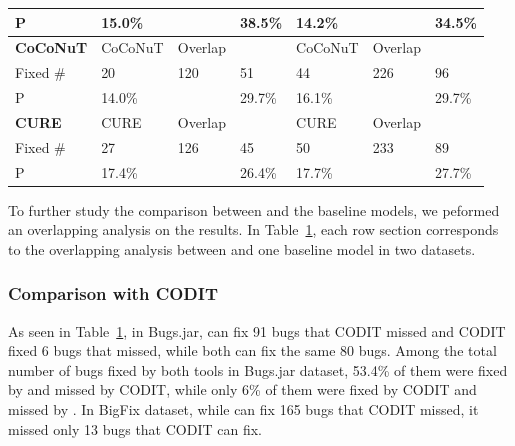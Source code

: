 {{\begin{table}[t]
\begin{center}
\begin{tabular}{p{1cm}<{\centering}|p{1.1cm}<{\centering}|p{0.8cm}<{\centering}|p{0.7cm}<{\centering}|p{1.1cm}<{\centering}|p{0.8cm}<{\centering}|p{0.7cm}<{\centering}}
			P            &  15.0\%  &    & 38.5\%  &  14.2\%  &    &  34.5\%\\
			\hline
			{\bf CoCoNuT}             & CoCoNuT   & Overlap   & \tool  & CoCoNuT   & Overlap   & \tool \\
			\hline
			Fixed \#     & \cellcolor{mygray} 20  & 120   & \cellcolor{mygray} 51 & \cellcolor{mygray}44 &  226  & \cellcolor{mygray} 96\\
			P            &  14.0\%  &    &  29.7\% &  16.1\%  &    & 29.7\% \\
			\hline
			{\bf CURE}             & CURE   & Overlap   & \tool  & CURE   & Overlap   & \tool \\
			\hline
			Fixed \#     & \cellcolor{mygray} 27  &  126  & \cellcolor{mygray} 45 & \cellcolor{mygray} 50&  233  & \cellcolor{mygray} 89\\
			P            &  17.4\%  &    & 26.4\%  & 17.7\%   &    &  27.7\%\\
			\hline
		\end{tabular}
		\label{RQ3_results}
	\end{center}
\end{table}
}}

To further study the comparison between {\tool} and the baseline
models, we peformed an overlapping analysis on the results.  In
Table~\ref{RQ3_results}, each row section corresponds to the
overlapping analysis between {\tool} and one baseline model
in two datasets.

\subsubsection{{\bf Comparison with CODIT}}

As seen in Table~\ref{RQ3_results}, in Bugs.jar, {\tool} can fix 91
bugs that CODIT missed and CODIT fixed 6 bugs that {\tool} missed,
while both can fix the same 80 bugs. Among the total number of bugs
fixed by both tools in Bugs.jar dataset, 53.4\% of them were fixed by
{\tool} and missed by CODIT, while only 6\% of them were fixed by
CODIT and missed by {\tool}. In BigFix dataset, while {\tool} can fix
165 bugs that CODIT missed, it missed only 13 bugs that CODIT can fix.

